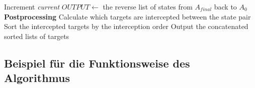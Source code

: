 \documentclass[german,version-2019-11]{uzl-thesis}
\begin{document}
{\begin{minipage}{1\linewidth}
\begin{algorithm}[H]
\begin{algorithmic}
\EndIf
\State Increment \emph{current}
\EndWhile
\State $OUTPUT \leftarrow$ the reverse list of states from $A_{final}$ back to $A_0$
~\\
\State \textbf{Postprocessing}
\State Calculate which targets are intercepted between the state pair 
\State Sort the intercepted targets by the interception order
\EndFor
\State Output the concatenated sorted lists of targets
\end{algorithmic}
\end{algorithm}
\end{minipage}
}

\subsection{Beispiel für die Funktionsweise des Algorithmus}
\end{document}
